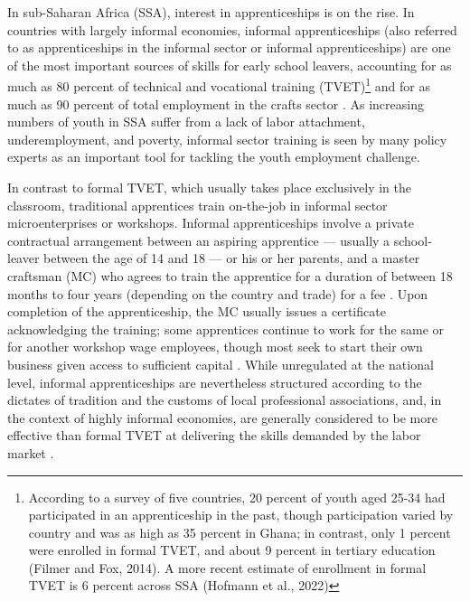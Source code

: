 \documentclass[
  a4paper, twoside, 12pt]{book}
\begin{document}
\newpage

\onehalfspacing

In sub-Saharan Africa (SSA), interest in apprenticeships is on the rise. In countries with largely informal economies, informal apprenticeships (also referred to as apprenticeships in the informal sector or informal apprenticeships) are one of the most important sources of skills for early school leavers, accounting for as much as 80 percent of technical and vocational training (TVET)\footnote{According to a survey of five countries, 20 percent of youth aged 25-34 had participated in an apprenticeship in the past, though participation varied by country and was as high as 35 percent in Ghana; in contrast, only 1 percent were enrolled in formal TVET, and about 9 percent in tertiary education (Filmer and Fox, 2014). A more recent estimate of enrollment in formal TVET is 6 percent across SSA (Hofmann et al., 2022)} and for as much as 90 percent of total employment in the crafts sector \autocite{walther2007,adams2013,filmer2014,worldbank2018}. As increasing numbers of youth in SSA suffer from a lack of labor attachment, underemployment, and poverty, informal sector training is seen by many policy experts as an important tool for tackling the youth employment challenge.

In contrast to formal TVET, which usually takes place exclusively in the classroom, traditional apprentices train on-the-job in informal sector microenterprises or workshops. Informal apprenticeships involve a private contractual arrangement between an aspiring apprentice --- usually a school-leaver between the age of 14 and 18 --- or his or her parents, and a master craftsman (MC) who agrees to train the apprentice for a duration of between 18 months to four years (depending on the country and trade) for a fee \autocite{hofmann2022}. Upon completion of the apprenticeship, the MC usually issues a certificate acknowledging the training; some apprentices continue to work for the same or for another workshop wage employees, though most seek to start their own business given access to sufficient capital \autocite{frazer2006}. While unregulated at the national level, informal apprenticeships are nevertheless structured according to the dictates of tradition and the customs of local professional associations, and, in the context of highly informal economies, are generally considered to be more effective than formal TVET at delivering the skills demanded by the labor market \autocite{ahadzie2009,africanunion2018,mayombe2021,allais2022}.
\end{document}
